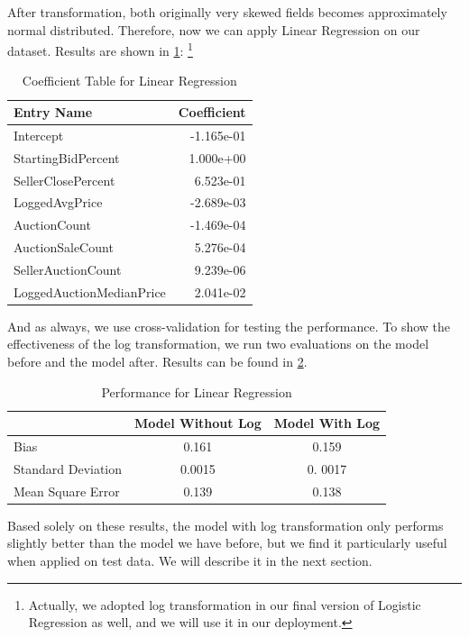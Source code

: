 \documentclass[CEJM,PDF]{cej} %
\begin{document}
After transformation, both originally very skewed fields becomes approximately normal distributed. Therefore, now we can apply Linear Regression on our dataset. Results are shown in \ref{r-linear}:
\footnote{Actually, we adopted log transformation in our final version of Logistic Regression as well, and we will use it in our deployment. }
\begin{table}[h]
\centering
\caption{Coefficient Table for Linear Regression}
\label{r-linear}
\begin{tabular}{@{}|l|r|@{}}
\toprule
\hline
Entry Name  & Coefficient \\ \midrule
\hline
Intercept & -1.165e-01   \\
\hline
StartingBidPercent & 1.000e+00 \\
\hline
SellerClosePercent & 6.523e-01  \\
\hline
LoggedAvgPrice & -2.689e-03 \\
\hline
AuctionCount & -1.469e-04   \\
\hline
AuctionSaleCount & 5.276e-04 \\
\hline
SellerAuctionCount & 9.239e-06   \\
\hline
LoggedAuctionMedianPrice & 2.041e-02  \\ \bottomrule
\hline
\end{tabular}
\end{table}

And as always, we use cross-validation for testing the performance. To show the effectiveness of the log transformation, we run two evaluations on the model before and the model after.  Results can be found in \ref{comp}.

\begin{table}[h]
\centering
\caption{Performance for Linear Regression}
\label{comp}
\begin{tabular}{@{}|l|c|c|@{}}
\toprule
\hline
    & Model Without Log  & Model With Log \\ \midrule
\hline
  Bias  &  0.161 & 0.159  \\ 
\hline
  Standard Deviation  &  0.0015  &  0. 0017 \\ 
\hline
  Mean Square Error    &  0.139  &  0.138  \\
\bottomrule \hline
\end{tabular}
\end{table}

Based solely on these results, the model with log transformation only performs slightly better than the model we have before, but we find it particularly useful when applied on test data. We will describe it in the next section.\\
\end{document}
